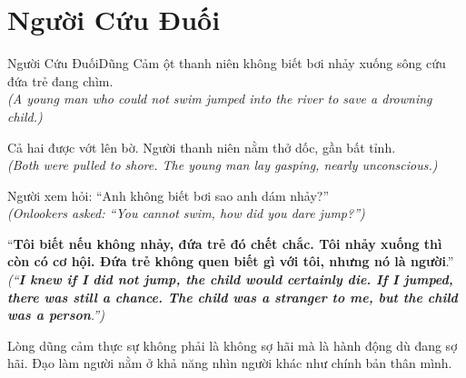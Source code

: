 \section{Người Cứu Đuối}
\begin{truyen}{Người Cứu Đuối}{Dũng Cảm}
ột thanh niên không biết bơi nhảy xuống sông cứu đứa trẻ đang chìm.\\
\textit{(A young man who could not swim jumped into the river to save a drowning child.)}

Cả hai được vớt lên bờ. Người thanh niên nằm thở dốc, gần bất tỉnh.\\
\textit{(Both were pulled to shore. The young man lay gasping, nearly unconscious.)}

Người xem hỏi: ``Anh không biết bơi sao anh dám nhảy?''\\
\textit{(Onlookers asked: ``You cannot swim, how did you dare jump?'')}

``\textbf{Tôi biết nếu không nhảy, đứa trẻ đó chết chắc. Tôi nhảy xuống thì còn có cơ hội. Đứa trẻ không quen biết gì với tôi, nhưng nó là người}.''\\
\textit{(``\textbf{I knew if I did not jump, the child would certainly die. If I jumped, there was still a chance. The child was a stranger to me, but the child was a person}.'')}
\end{truyen}
\begin{baihoc}
  Lòng dũng cảm thực sự không phải là không sợ hãi mà là hành động dù đang sợ hãi. Đạo làm người nằm ở khả năng nhìn người khác như chính bản thân mình.
\end{baihoc}

